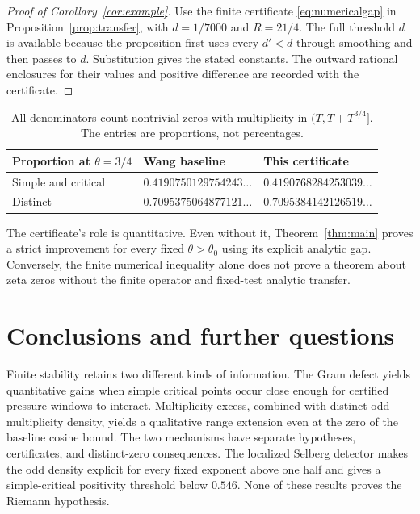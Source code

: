 \documentclass[11pt]{article}
\theoremstyle{remark}
\begin{document}
\begin{proof}[Proof of Corollary~\ref{cor:example}]
Use the finite certificate \eqref{eq:numericalgap} in
Proposition~\ref{prop:transfer}, with $d=1/7000$ and $R=21/4$.
The full threshold $d$ is available because the proposition first uses
every $d'<d$ through smoothing and then passes to $d$. Substitution
gives the stated constants. The outward rational enclosures for their
values and positive difference are recorded with the certificate.
\end{proof}

\begin{table}[ht]
\centering
\begin{tabular}{@{}lll@{}}
\toprule
Proportion at $\theta=3/4$ & Wang baseline & This certificate\\
\midrule
Simple and critical & $0.4190750129754243\ldots$ & $0.4190768284253039\ldots$\\
Distinct & $0.7095375064877121\ldots$ & $0.7095384142126519\ldots$\\
\bottomrule
\end{tabular}
\caption{All denominators count nontrivial zeros with multiplicity in
$(T,T+T^{3/4}]$. The entries are proportions, not percentages.}
\end{table}

The certificate's role is quantitative. Even without it,
Theorem~\ref{thm:main} proves a strict improvement for every fixed
$\theta>\theta_0$ using its explicit analytic gap. Conversely, the
finite numerical inequality alone does not prove a theorem about zeta
zeros without the finite operator and fixed-test analytic transfer.

\section{Conclusions and further questions}

Finite stability retains two different kinds of information. The Gram
defect yields quantitative gains when simple critical points occur close
enough for certified pressure windows to interact. Multiplicity excess,
combined with distinct odd-multiplicity density, yields a qualitative
range extension even at the zero of the baseline cosine bound. The
two mechanisms have separate hypotheses, certificates, and distinct-zero
consequences. The localized Selberg detector makes the odd density explicit
for every fixed exponent above one half and gives a simple-critical positivity
threshold below $0.546$. None of these results proves the Riemann hypothesis.
\end{document}
